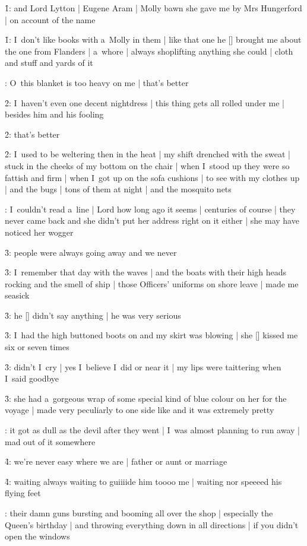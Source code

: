 \f1:
and Lord Lytton |
Eugene Aram |
Molly bawn she gave me by Mrs Hungerford |
on account of the name

\f1:
I~don't like books with a~Molly in them |
like that one he [\bloom] brought me about the one from Flanders |
a~whore |
always shoplifting anything she could |
cloth and stuff and yards of it

:
O~this blanket is too heavy on me |
that's better

\f2:
I~haven't even one decent nightdress |
this thing gets all rolled under me |
besides him and his fooling

\f2:
that's better

\f2:
I~used to be weltering then in the heat |
my shift drenched with the sweat |
stuck in the cheeks of my bottom on the chair |
when I~stood up they were so fattish and firm |
when I~got up on the sofa cushions |
to see with my clothes up |
and the bugs |
tons of them at night |
and the mosquito nets

:
I~couldn't read a~line |
Lord how long ago it seems |
centuries of course |
they never came back and she didn't put her address right on it either |
she may have noticed her wogger

\f3:
people were always going away and we never

\f3:
I~remember that day with the waves |
and the boats with their high heads rocking and the smell of ship |
those Officers' uniforms on shore leave |
made me seasick

\f3:
he [\wogger] didn't say anything |
he was very serious

\f3:
I~had the high buttoned boots on and my skirt was blowing |
she [\hester] kissed me six or seven times

\f3:
didn't I~cry |
yes I~believe I~did or near it |
my lips were taittering when I~said goodbye

\f3:
she had a~gorgeous wrap of some special kind of blue colour on her for the voyage |
made very peculiarly to one side like and it was extremely pretty

:
it got as dull as the devil after they went |
I~was almost planning to run away |
mad out of it somewhere

\f4:
we're never easy where we are |
father or aunt or marriage

\f4:
waiting always waiting to guiiiide him toooo me |
waiting nor speeeed his flying feet

:
their damn guns bursting and booming all over the shop |
especially the Queen's birthday |
and throwing everything down in all directions |
if you didn't open the windows


